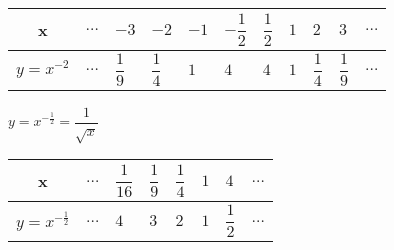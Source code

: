 \begin{table}[h]
\renewcommand\arraystretch{2}
\begin{tabular}{|c|*{10}{w{c}{2em}|}}
    \hline
    x & $\dots$ & $-3$ & $-2$ & $-1$ & $-\dfrac 1 2$ & $\dfrac 1 2$ & $1$ & $2$ & $3$ & $\dots$ \\
    \hline
    $y = x^{-2}$ & $\dots$ & $\dfrac 1 9$ & $\dfrac 1 4$ & $1$ & $4$ & $4$ & $1$ & $\dfrac 1 4$ & $\dfrac 1 9$ & $\dots$ \\
    \hline
\end{tabular}
\end{table}

\vspace{0.5em}
$y = x^{-\frac 1 2} = \dfrac 1 {\sqrt{x}}$

\begin{table}[h]
\renewcommand\arraystretch{2}
\begin{tabular}{|c|*{7}{w{c}{2em}|}}
    \hline
    x & $\dots$ & $\dfrac 1 {16}$ & $\dfrac 1 9$ & $\dfrac 1 4$ & $1$ & $4$ & $\dots$ \\
    \hline
    $y = x^{-\frac 1 2}$ & $\dots$ & $4$ & $3$ & $2$ & $1$ & $\dfrac 1 2$ & $\dots$ \\
    \hline
\end{tabular}
\end{table}

